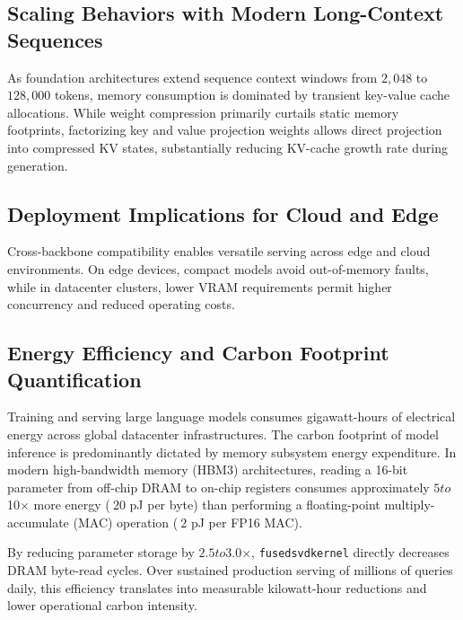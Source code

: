 \subsection{Scaling Behaviors with Modern Long-Context Sequences}
As foundation architectures extend sequence context windows from $2{,}048$ to $128{,}000$ tokens, memory consumption is dominated by transient key-value cache allocations. While weight compression primarily curtails static memory footprints, factorizing key and value projection weights allows direct projection into compressed KV states, substantially reducing KV-cache growth rate during generation.

\subsection{Deployment Implications for Cloud and Edge}
Cross-backbone compatibility enables versatile serving across edge and cloud environments. On edge devices, compact models avoid out-of-memory faults, while in datacenter clusters, lower VRAM requirements permit higher concurrency and reduced operating costs.

\subsection{Energy Efficiency and Carbon Footprint Quantification}
Training and serving large language models consumes gigawatt-hours of electrical energy across global datacenter infrastructures. The carbon footprint of model inference is predominantly dictated by memory subsystem energy expenditure. In modern high-bandwidth memory (HBM3) architectures, reading a 16-bit parameter from off-chip DRAM to on-chip registers consumes approximately $5$\times$ to $10$\times$ more energy ($~20$ pJ per byte) than performing a floating-point multiply-accumulate (MAC) operation ($~2$ pJ per FP16 MAC).

By reducing parameter storage by $2.5$\times$ to $3.0$\times$, \texttt{fusedsvdkernel} directly decreases DRAM byte-read cycles. Over sustained production serving of millions of queries daily, this efficiency translates into measurable kilowatt-hour reductions and lower operational carbon intensity.

